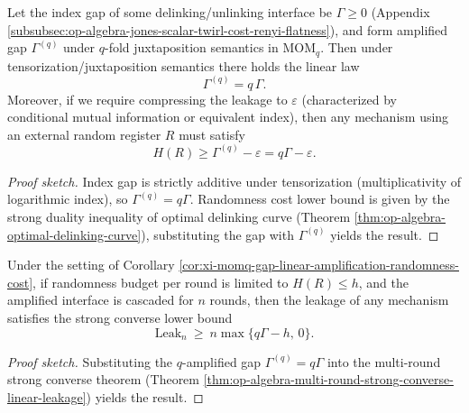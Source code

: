 \begin{corollary}\label{cor:xi-momq-gap-linear-amplification-randomness-cost}
Let the index gap of some delinking/unlinking interface be \(\Gamma\ge 0\) (Appendix \ref{subsubsec:op-algebra-jones-scalar-twirl-cost-renyi-flatness}), and form amplified gap \(\Gamma^{(q)}\) under \(q\)-fold juxtaposition semantics in \(\mathrm{MOM}_q\).
Then under tensorization/juxtaposition semantics there holds the linear law
\[
\boxed{\;\Gamma^{(q)}=q\,\Gamma.\;}
\]
Moreover, if we require compressing the leakage to \(\varepsilon\) (characterized by conditional mutual information or equivalent index), then any mechanism using an external random register \(R\) must satisfy
\[
\boxed{\;H(R)\ge \Gamma^{(q)}-\varepsilon=q\Gamma-\varepsilon.\;}
\]
\end{corollary}
\begin{proof}[Proof sketch]
Index gap is strictly additive under tensorization (multiplicativity of logarithmic index), so \(\Gamma^{(q)}=q\Gamma\).
Randomness cost lower bound is given by the strong duality inequality of optimal delinking curve (Theorem \ref{thm:op-algebra-optimal-delinking-curve}), substituting the gap with \(\Gamma^{(q)}\) yields the result.
\end{proof}

\begin{corollary}\label{cor:xi-momq-strong-converse-bilinear-leakage}
Under the setting of Corollary \ref{cor:xi-momq-gap-linear-amplification-randomness-cost}, if randomness budget per round is limited to \(H(R)\le h\), and the amplified interface is cascaded for \(n\) rounds, then the leakage of any mechanism satisfies the strong converse lower bound
\[
\boxed{\;
\mathrm{Leak}_n\ \ge\ n\max\{q\Gamma-h,\,0\}. \;}
\]
\end{corollary}
\begin{proof}[Proof sketch]
Substituting the \(q\)-amplified gap \(\Gamma^{(q)}=q\Gamma\) into the multi-round strong converse theorem (Theorem \ref{thm:op-algebra-multi-round-strong-converse-linear-leakage}) yields the result.
\end{proof}

